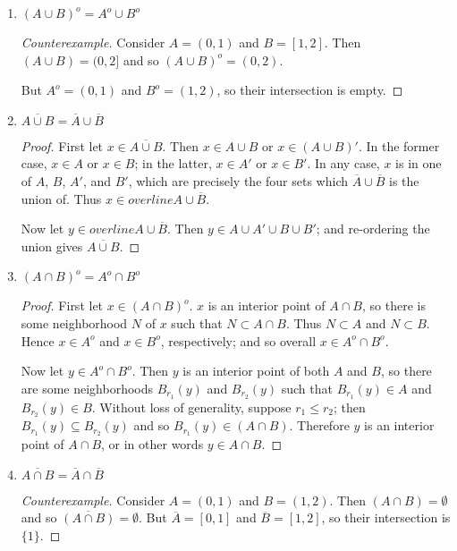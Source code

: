 \documentclass{article}
\begin{document}
\begin{enumerate}
    \item %
    $(A \cup B)^o = A^o \cup B^o$
    \begin{proof}[Counterexample]
        Consider $A = (0, 1)$ and $B = [1, 2]$. Then $(A \cup B) = (0, 2]$ and so $(A \cup B)^o = (0, 2)$. 

        But $A^o = (0, 1)$ and $B^o = (1, 2)$, so their intersection is empty.        
    \end{proof}

    \item %
    $\overline{A \cup B} = \overline{A} \cup \overline{B}$
    \begin{proof}
        First let $x \in \overline{A \cup B}$. Then $x \in A \cup B$ or $x \in (A \cup B)'$. In the former case, $x \in A$ or $x \in B$; in the latter, $x \in A'$ or $x \in B'$. In any case, $x$ is in one of $A$, $B$, $A'$, and $B'$, which are precisely the four sets which $\overline{A} \cup \overline{B}$ is the union of. Thus $x \in overline{A} \cup \overline{B}$.

        Now let $y \in overline{A} \cup \overline{B}$. Then $y \in A \cup A' \cup B \cup B'$; and re-ordering the union gives $\overline{A \cup B}$.         
    \end{proof}


    \item %
    $(A \cap B)^o = A^o \cap B^o$
    \begin{proof}
        First let $x \in (A \cap B)^o$. $x$ is an interior point of $A \cap B$, so there is some neighborhood $N$ of $x$ such that $N \subset A \cap B$. Thus $N \subset A$ and $N \subset B$. Hence $x \in A^o$ and $x \in B^o$, respectively; and so overall $x \in A^o \cap B^o$.

        Now let $y \in A^o \cap B^o$. Then $y$ is an interior point of both $A$ and $B$, so there are some neighborhoods $B_{r_1}(y)$ and $B_{r_2}(y)$ such that $B_{r_1}(y) \in A$ and $B_{r_2}(y) \in B$. Without loss of generality, suppose $r_1 \le r_2$; then $B_{r_1}(y) \subseteq B_{r_2}(y)$ and so $B_{r_1}(y) \in (A \cap B)$. Therefore $y$ is an interior point of $A \cap B$, or in other words $y \in A \cap B$.        
    \end{proof}

    \item %
    $\overline{A \cap B} = \overline{A} \cap \overline{B}$
    \begin{proof}[Counterexample]
        Consider $A = (0, 1)$ and $B = (1, 2)$. Then $(A \cap B) = \emptyset$ and so $\overline{(A \cap B)} = \emptyset$. But $\overline{A} = [0, 1]$ and $\overline{B} = [1, 2]$, so their intersection is $\{1\}$.
        
    \end{proof}

\end{enumerate}
\end{document}

